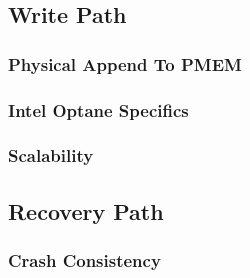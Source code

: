 \documentclass[12pt,a4paper,twoside]{book}
\begin{document}

\subsection{Write Path}\label{di:prb:write}

\subsubsection{Physical Append To PMEM}

\subsubsection{Intel Optane Specifics}\label{di:prb:write:optanespecifics}

\subsubsection{Scalability}\label{di:prb:write:scalability}

\subsection{Recovery Path}\label{di:prb:recovery}

\subsubsection{Crash Consistency}


\end{document}
